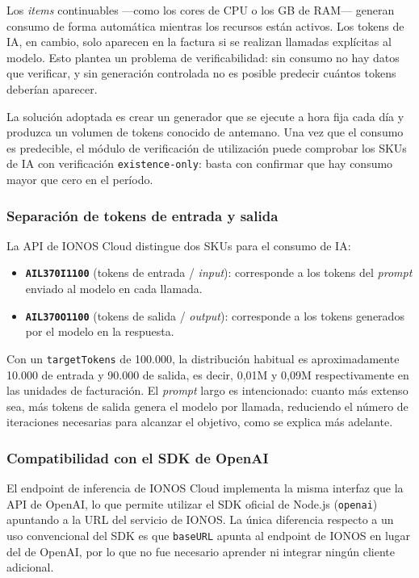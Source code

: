 Los \textit{items} continuables ---como los cores de CPU o los GB de RAM--- generan consumo de forma automática mientras los recursos están activos. Los tokens de IA, en cambio, solo aparecen en la factura si se realizan llamadas explícitas al modelo. Esto plantea un problema de verificabilidad: sin consumo no hay datos que verificar, y sin generación controlada no es posible predecir cuántos tokens deberían aparecer.

La solución adoptada es crear un generador que se ejecute a hora fija cada día y produzca un volumen de tokens conocido de antemano. Una vez que el consumo es predecible, el módulo de verificación de utilización puede comprobar los SKUs de IA con verificación \texttt{existence-only}: basta con confirmar que hay consumo mayor que cero en el período.

\subsubsection{Separación de tokens de entrada y salida}

La API de IONOS Cloud distingue dos SKUs para el consumo de IA:

\begin{itemize}
    \item \textbf{\texttt{AIL370I1100}} (tokens de entrada / \textit{input}): corresponde a los tokens del \textit{prompt} enviado al modelo en cada llamada.
    \item \textbf{\texttt{AIL370O1100}} (tokens de salida / \textit{output}): corresponde a los tokens generados por el modelo en la respuesta.
\end{itemize}

Con un \texttt{targetTokens} de 100.000, la distribución habitual es aproximadamente 10.000 de entrada y 90.000 de salida, es decir, 0,01M y 0,09M respectivamente en las unidades de facturación. El \textit{prompt} largo es intencionado: cuanto más extenso sea, más tokens de salida genera el modelo por llamada, reduciendo el número de iteraciones necesarias para alcanzar el objetivo, como se explica más adelante.

\subsubsection{Compatibilidad con el SDK de OpenAI}

El endpoint de inferencia de IONOS Cloud implementa la misma interfaz que la API de OpenAI, lo que permite utilizar el SDK oficial de Node.js (\texttt{openai}) apuntando a la URL del servicio de IONOS. La única diferencia respecto a un uso convencional del SDK es que \texttt{baseURL} apunta al endpoint de IONOS en lugar del de OpenAI, por lo que no fue necesario aprender ni integrar ningún cliente adicional.

